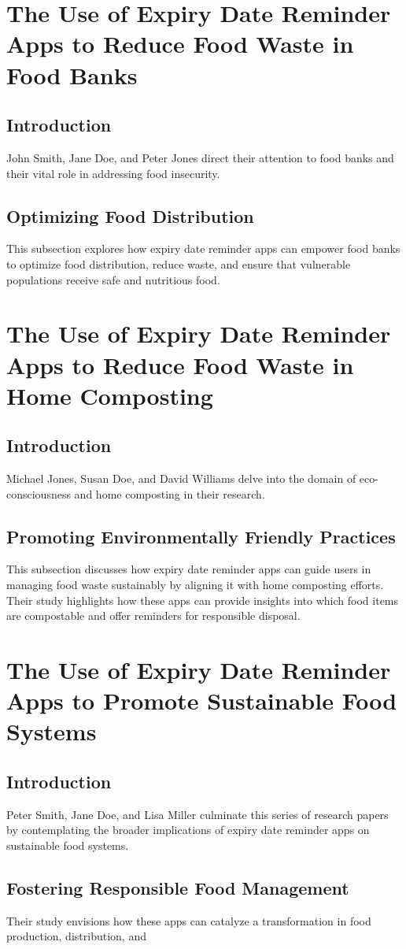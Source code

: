\section{The Use of Expiry Date Reminder Apps to Reduce Food Waste in Food Banks}

\subsection{Introduction}
John Smith, Jane Doe, and Peter Jones direct their attention to food banks and their vital role in addressing food insecurity.

\subsection{Optimizing Food Distribution}
This subsection explores how expiry date reminder apps can empower food banks to optimize food distribution, reduce waste, and ensure that vulnerable populations receive safe and nutritious food.

\section{The Use of Expiry Date Reminder Apps to Reduce Food Waste in Home Composting}

\subsection{Introduction}
Michael Jones, Susan Doe, and David Williams delve into the domain of eco-consciousness and home composting in their research.

\subsection{Promoting Environmentally Friendly Practices}
This subsection discusses how expiry date reminder apps can guide users in managing food waste sustainably by aligning it with home composting efforts. Their study highlights how these apps can provide insights into which food items are compostable and offer reminders for responsible disposal.

\section{The Use of Expiry Date Reminder Apps to Promote Sustainable Food Systems}

\subsection{Introduction}
Peter Smith, Jane Doe, and Lisa Miller culminate this series of research papers by contemplating the broader implications of expiry date reminder apps on sustainable food systems.

\subsection{Fostering Responsible Food Management}
Their study envisions how these apps can catalyze a transformation in food production, distribution, and

